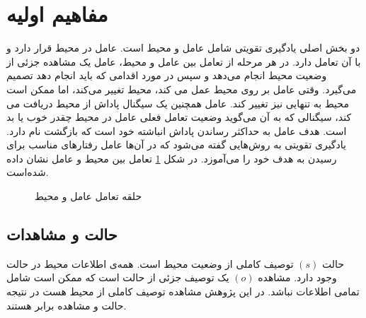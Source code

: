 \section{مفاهیم اولیه}
دو بخش اصلی یادگیری تقویتی
شامل عامل
 و محیط
  است. عامل در محیط قرار دارد و با آن تعامل دارد.
  در هر مرحله از تعامل بین عامل و محیط، عامل یک مشاهده جزئی از وضعیت محیط انجام می‌دهد و سپس در مورد اقدامی که باید انجام دهد تصمیم می‌گیرد. وقتی عامل بر روی محیط عمل می کند، محیط تغییر می‌کند، اما ممکن است محیط به تنهایی نیز تغییر کند.
  عامل همچنین یک سیگنال پاداش
   از محیط دریافت می کند، سیگنالی که به آن می‌گوید وضعیت تعامل فعلی عامل  در محیط چقدر خوب یا بد است. هدف عامل به حداکثر رساندن پاداش انباشته خود است که بازگشت
    نام دارد. یادگیری تقویتی به روش‌هایی گفته می‌شود که در آن‌ها عامل رفتارهای مناسب برای رسیدن به هدف خود را می‌آموزد. در شکل
    \ref{fig:agent_env}
    تعامل بین محیط و عامل نشان داده شده‌است.
\begin{figure}[H]
	\begin{center}
	\end{center}
	\caption{حلقه تعامل عامل و محیط}
	\label{fig:agent_env}
\end{figure}
\subsection{حالت و مشاهدات}
حالت
\((s)\)
 توصیف کاملی از وضعیت محیط است. همه‌ی اطلاعات محیط در حالت وجود دارد. مشاهده
 \((o)\)
  یک توصیف جزئی از حالت است که ممکن است شامل تمامی اطلاعات نباشد. در این پژوهش مشاهده توصیف کاملی از محیط هست در نتیجه حالت و مشاهده برابر هستند.
